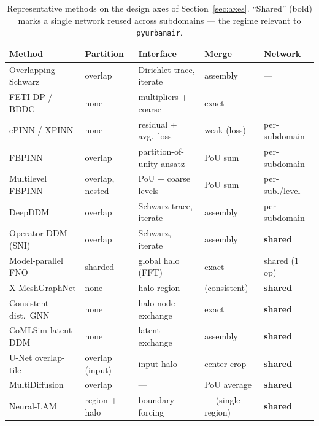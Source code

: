 \documentclass[11pt]{article}
\begin{document}
\begin{table}[t]
\centering\footnotesize
\setlength{\tabcolsep}{4pt}
\begin{tabularx}{\textwidth}{@{}l l l l l@{}}
\toprule
\textbf{Method} & \textbf{Partition} & \textbf{Interface} & \textbf{Merge} & \textbf{Network} \\
\midrule
Overlapping Schwarz \cite{lions1988schwarz} & overlap & Dirichlet trace, iterate & assembly & --- \\
FETI-DP / BDDC \cite{farhat2001fetidp,dohrmann2003bddc} & none & multipliers + coarse & exact & --- \\
cPINN / XPINN \cite{jagtap2020cpinn,jagtap2020xpinn} & none & residual + avg.\ loss & weak (loss) & per-subdomain \\
FBPINN \cite{moseley2023fbpinn} & overlap & partition-of-unity ansatz & PoU sum & per-subdomain \\
Multilevel FBPINN \cite{dolean2024multilevel} & overlap, nested & PoU + coarse levels & PoU sum & per-sub./level \\
DeepDDM \cite{li2020deepddm} & overlap & Schwarz trace, iterate & assembly & per-subdomain \\
Operator DDM (SNI) \cite{huang2025operatorddm} & overlap & Schwarz, iterate & assembly & \textbf{shared} \\
Model-parallel FNO \cite{grady2023modelparallelfno} & sharded & global halo (FFT) & exact & shared (1 op) \\
X-MeshGraphNet \cite{nabian2024xmeshgraphnet} & none & halo region & (consistent) & \textbf{shared} \\
Consistent dist.\ GNN \cite{barwey2024consistentgnn} & none & halo-node exchange & exact & \textbf{shared} \\
CoMLSim latent DDM \cite{hanna2024comlsim} & none & latent exchange & assembly & \textbf{shared} \\
U-Net overlap-tile \cite{ronneberger2015unet} & overlap (input) & input halo & center-crop & \textbf{shared} \\
MultiDiffusion \cite{bartal2023multidiffusion} & overlap & --- & PoU average & \textbf{shared} \\
Neural-LAM \cite{oskarsson2023neurallam} & region + halo & boundary forcing & --- (single region) & \textbf{shared} \\
\bottomrule
\end{tabularx}
\caption{Representative methods on the design axes of Section~\ref{sec:axes}.
``Shared'' (bold) marks a single network reused across subdomains --- the regime
relevant to \texttt{pyurbanair}.}
\label{tab:taxonomy}
\end{table}
\end{document}
